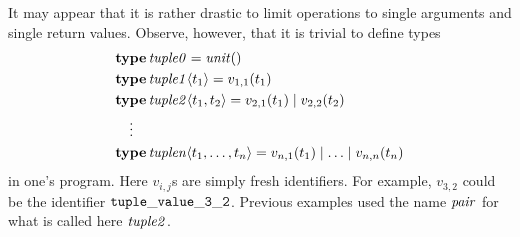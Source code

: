 \documentclass[a4paper,12pt,oneside,fleqn]{book} %
\begin{document}
\begin{remark}
It may appear that it is rather drastic to limit operations to single
arguments and single return values. Observe, however, that it is trivial to
define types
\begin{align}
&{\bf type}\,{\it tuple0} = {\it unit}() \\
&{\bf type}\,{\it tuple1}\langle t_1\rangle = v_{1,1}(t_1) \\
&{\bf type}\,{\it tuple2}\langle t_1,t_2\rangle = v_{2,1}(t_1) \mid v_{2,2}(t_2) \\
&\quad\vdots\notag \\
&{\bf type}\,{\it tuplen}\langle t_1,\ldots,t_n\rangle
  = v_{n,1}(t_1) \mid \ldots \mid v_{n,n}(t_n)
\end{align}
in one's program. Here $v_{i,j}$s are simply fresh identifiers. For
example, $v_{3,2}$ could be the identifier ${\tt tuple\_value\_3\_2}$.
Previous examples used the name $\it pair$ for what is called here $\it
tuple2$.
\end{remark}
\end{document}
